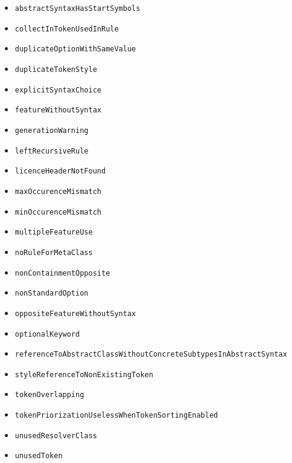 \begin{itemize}
\item \texttt{abstractSyntaxHasStartSymbols}
\item \texttt{collectInTokenUsedInRule}
\item \texttt{duplicateOptionWithSameValue}
\item \texttt{duplicateTokenStyle}
\item \texttt{explicitSyntaxChoice}
\item \texttt{featureWithoutSyntax}
\item \texttt{generationWarning}
\item \texttt{leftRecursiveRule}
\item \texttt{licenceHeaderNotFound}
\item \texttt{maxOccurenceMismatch}
\item \texttt{minOccurenceMismatch}
\item \texttt{multipleFeatureUse}
\item \texttt{noRuleForMetaClass}
\item \texttt{nonContainmentOpposite}
\item \texttt{nonStandardOption}
\item \texttt{oppositeFeatureWithoutSyntax}
\item \texttt{optionalKeyword}
\item \texttt{referenceToAbstractClassWithoutConcreteSubtypesInAbstractSyntax}
\item \texttt{styleReferenceToNonExistingToken}
\item \texttt{tokenOverlapping}
\item \texttt{tokenPriorizationUselessWhenTokenSortingEnabled}
\item \texttt{unusedResolverClass}
\item \texttt{unusedToken}
\end{itemize}
